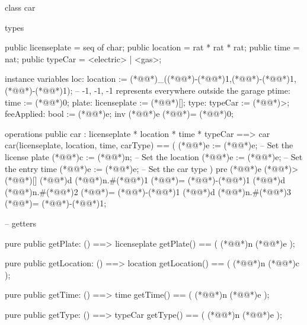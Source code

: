 \documentclass[a4paper]{article}
\begin{document}
\title{}
\author{}
\begin{vdm_al}
class car

types

public licenseplate = seq of char;
public location = rat * rat * rat;
public time = nat;
public typeCar = <electric> | <gas>;

instance variables
loc: location := (*@@*)_((*@\vdmnotcovered{}@*)-(*@\vdmnotcovered{}@*)1,(*@\vdmnotcovered{}@*)-(*@\vdmnotcovered{}@*)1,(*@\vdmnotcovered{}@*)-(*@\vdmnotcovered{}@*)1); -- -1, -1, -1 represents everywhere outside the garage
ptime: time := (*@\vdmnotcovered{}@*)0;
plate: licenseplate := (*@\vdmnotcovered{}@*)[];
type: typeCar := (*@@*)>;
feeApplied: bool := (*@@*)e;
inv (*@@*)e (*@\vdmnotcovered{>}@*)= (*@\vdmnotcovered{}@*)0;

operations
public car : licenseplate * location * time * typeCar ==> car
car(licenseplate, location, time, carType) ==
  (
    (*@@*)e := (*@@*)e;   -- Set the license plate
    (*@@*)c := (*@@*)n;         -- Set the location
    (*@@*)e := (*@@*)e;           -- Set the entry time
    (*@@*)e := (*@@*)e;      -- Set the car type
  )
  pre (*@@*)e (*@\vdmnotcovered{<}@*)> (*@\vdmnotcovered{}@*)[] (*@@*)d (*@@*)n.#(*@\vdmnotcovered{}@*)1 (*@\vdmnotcovered{>}@*)= (*@\vdmnotcovered{}@*)-(*@\vdmnotcovered{}@*)1 (*@@*)d (*@@*)n.#(*@\vdmnotcovered{}@*)2 (*@\vdmnotcovered{>}@*)= (*@\vdmnotcovered{}@*)-(*@\vdmnotcovered{}@*)1 (*@@*)d (*@@*)n.#(*@\vdmnotcovered{}@*)3 (*@\vdmnotcovered{>}@*)= (*@\vdmnotcovered{}@*)-(*@\vdmnotcovered{}@*)1;
  

-- getters

pure public getPlate: () ==> licenseplate
getPlate() == (
    (*@@*)n (*@@*)e
);

pure public getLocation: () ==> location
getLocation() == (
(*@@*)n (*@@*)c
);

pure public getTime: () ==> time
getTime() == (
(*@@*)n (*@@*)e
);

pure public getType: () ==> typeCar 
getType() == (
(*@@*)n (*@@*)e 
);


\end{vdm_al}
\end{document}
